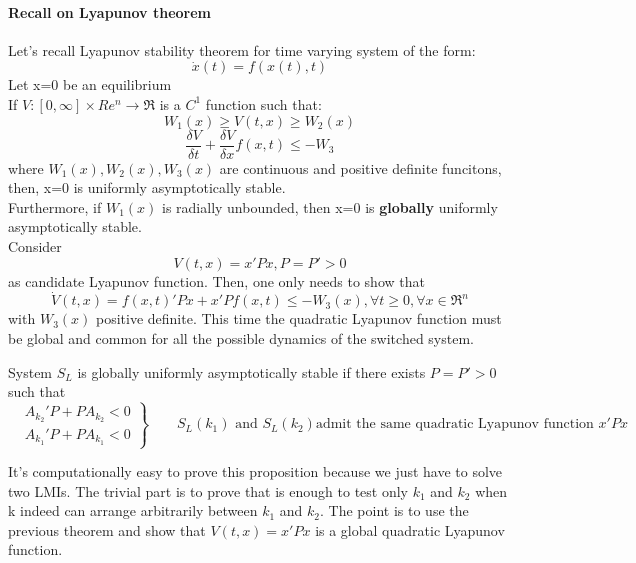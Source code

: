 \paragraph{Recall on Lyapunov theorem}
Let's recall Lyapunov stability theorem for time varying system of the form:\[\dot{x}(t)=f(x(t),t)	\]
Let x=0 be an equilibrium\\If $V\colon [0,\infty]\times 	Re^n\to\Re$ is a $C^1$ function such that:\[W_1(x)\ge V(t,x) \ge W_2(x)\]\[\frac{\delta V}{\delta t}+\frac{\delta V}{\delta x}f(x,t)\le-W_3\] where $W_1(x), W_2(x), W_3(x)$ are continuous and positive definite funcitons, then, x=0 is uniformly asymptotically stable.\\Furthermore, if $W_1(x)$ is radially unbounded, then x=0 is \textbf{globally} uniformly asymptotically stable.\\Consider\[\boxed{V(t,x)=x'Px,P=P'>0}\] as candidate Lyapunov function. Then, one only needs to show that \[\dot{V}(t,x)=f(x,t)'Px+x'Pf(x,t)\le-W_3(x),\forall t\ge 0,\forall x \in \Re^n\] with $W_3(x)$ positive definite.
This time the quadratic Lyapunov function must be global and common for all the possible dynamics of the switched system.
\begin{prop}
	System $S_L$ is globally uniformly asymptotically stable if there exists $P=P'>0$ such that
	\[
	\left.
	\begin{aligned}
		& A_{k_2}'P+PA_{k_2}<0\\
		& A_{k_1}'P+PA_{k_1}<0
	\end{aligned}
	\right\rbrace
	\qquad S_L(k_1)\text{ and }S_L(k_2) \text{admit the same quadratic Lyapunov function } x'Px
	\]
\end{prop}
It's computationally easy to prove this proposition because we just have to solve two LMIs. The trivial part is to prove that is enough to test only $k_1$ and $k_2$ when k indeed can arrange arbitrarily between $k_1$ and $k_2$. The point is to use the previous theorem and show that $V(t,x)=x'Px$ is a global quadratic Lyapunov function.
